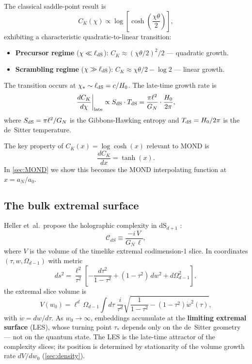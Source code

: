\documentclass[a4paper,11pt]{article}
\newcommand{\CdS}{\mathcal{C}_{dS}}                  %
\newcommand{\tausk}{\tau_*}                          %
\newcommand{\az}{a_0}                                %
\newcommand{\aN}{a_N}                                %
\newcommand{\elldS}{\ell_{\rm dS}}                   %
\newcommand{\TdS}{T_{\rm dS}}                        %
\newcommand{\SdS}{S_{\rm dS}}                        %
\newcommand{\GN}{G_N}                                %
\begin{document}
The classical saddle-point result \cite[Eq.~20]{Heller:2025} is
\begin{equation}
  C_K(\chi) \propto \log\!\left[\cosh\!\left(\frac{\chi\theta}{2}\right)\right],
  \label{eq:CK_classical}
\end{equation}
exhibiting a characteristic quadratic-to-linear transition:
\begin{itemize}
  \item \textbf{Precursor regime} ($\chi\ll\elldS$):
    $C_K\approx(\chi\theta/2)^2/2$ --- quadratic growth.
  \item \textbf{Scrambling regime} ($\chi\gg\elldS$):
    $C_K\approx\chi\theta/2 - \log 2$ --- linear growth.
\end{itemize}
The transition occurs at $\chi_*\sim\elldS=c/H_0$.
The late-time growth rate \cite[Eq.~70]{Heller:2025} is
\begin{equation}
  \frac{dC_K}{d\chi}\bigg|_{\rm late}
  \propto \SdS\cdot\TdS
  = \frac{\pi\ell^2}{\GN}\cdot\frac{H_0}{2\pi},
  \label{eq:growth_rate}
\end{equation}
where $\SdS=\pi\ell^2/\GN$ is the Gibbons-Hawking entropy and
$\TdS=H_0/2\pi$ is the de~Sitter temperature.

The key property of $C_K(x)=\log\cosh(x)$ relevant to MOND is
\begin{equation}
  \frac{dC_K}{dx} = \tanh(x).
  \label{eq:mu_from_CK}
\end{equation}
In \cref{sec:MOND} we show this becomes the MOND interpolating function
at $x=\aN/\az$.

\subsection{The bulk extremal surface}

Heller et~al.\ propose the holographic complexity in $\mathrm{dS}_{d+1}$
\cite[Eq.~23]{Heller:2025}:
\begin{equation}
  \CdS \equiv \frac{-i\,V}{\GN\,\ell},
  \label{eq:CdS_def}
\end{equation}
where $V$ is the volume of the timelike extremal codimension-1 slice.
In coordinates $(\tau,w,\Omega_{d-1})$ with metric
\begin{equation}
  ds^2 = \frac{\ell^2}{\tau^2}\!\left[
    -\frac{d\tau^2}{1-\tau^2} + (1-\tau^2)\,dw^2 + d\Omega_{d-1}^2
  \right],
  \label{eq:dS_metric}
\end{equation}
the extremal slice volume is
\begin{equation}
  V(w_0) = \ell^d\,\Omega_{d-1}\int d\tau\;
  \frac{i}{\tau^d}\sqrt{\frac{1}{1-\tau^2}-(1-\tau^2)\dot{w}^2(\tau)},
  \label{eq:V_integral}
\end{equation}
with $\dot{w}=dw/d\tau$.  As $w_0\to\infty$, embeddings accumulate at the
\textbf{limiting extremal surface} (LES), whose turning point $\tausk$
depends only on the de~Sitter geometry --- not on the quantum state.  The
LES is the late-time attractor of the complexity slices; its position is
determined by stationarity of the volume growth rate $dV/dw_0$
(\cref{sec:density}).
\end{document}
